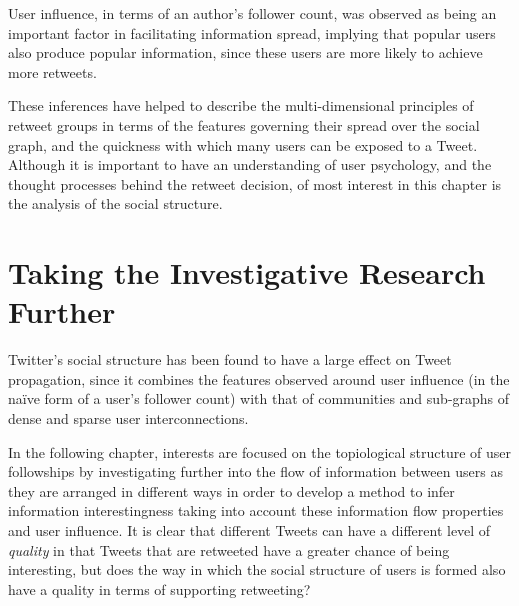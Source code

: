 User influence, in terms of an author's follower count, was observed as being an important factor in facilitating information spread, implying that popular users also produce popular information, since these users are more likely to achieve more retweets.

These inferences have helped to describe the multi-dimensional principles of retweet groups in terms of the features governing their spread over the social graph, and the quickness with which many users can be exposed to a Tweet. Although it is important to have an understanding of user psychology, and the thought processes behind the retweet decision, of most interest in this chapter is the analysis of the social structure.


\section{Taking the Investigative Research Further}
Twitter's social structure has been found to have a large effect on Tweet propagation, since it combines the features observed around user influence (in the na{\"i}ve form of a user's follower count) with that of communities and sub-graphs of dense and sparse user interconnections.

In the following chapter, interests are focused on the topiological structure of user followships by investigating further into the flow of information between users as they are arranged in different ways in order to develop a method to infer information interestingness taking into account these information flow properties and user influence. It is clear that different Tweets can have a different level of \textit{quality} in that Tweets that are retweeted have a greater chance of being interesting, but does the way in which the social structure of users is formed also have a quality in terms of supporting retweeting?
